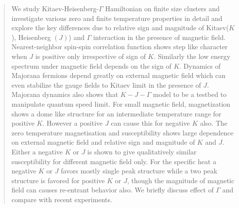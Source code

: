 \documentclass[aps,amsmath,twocolumn,amssymb,floatfix,showpacs,superscriptaddress,nofootinbib,longbibliography]{revtex4-1}
\begin{document}
\begin{abstract}
We study Kitaev-Heisenberg-$\Gamma$ Hamiltonian on finite size clusters and investigate  various zero and finite temperature properties in detail and explore the key differences due to relative sign and magnitude of Kitaev($K$), Heisenberg $(J)$) and $\Gamma$ interaction in the presence of magnetic field. Nearest-neighbor spin-spin correlation function shows step like character when $J$ is positive only irrespective of sign of $K$. Similarly the low energy spectrum under magnetic field depends on the sign of $K$. Dynamics of Majorana fermions depend greatly on external magnetic field which can even stabilize the gauge fields to Kitaev limit in the presence of $J$. Majorana dynamics also shows that $K-J-\Gamma$ model to be a testbed to manipulate quantum speed limit.   For small magnetic field, magnetization shows a dome like structure for an intermediate temperature range for positive $K$. However a positive $J$ can cause this for negative $K$ also. The zero temperature magnetisation and susceptibility shows large dependence on external magnetic field and relative sign and magnitude of $K$ and $J$. Either a negative $K$ or $J$ is shown to give qualitatively similar susceptibility for different magnetic field only.  For the specific heat a negative $K$ or $J$ favors mostly single peak structure while a two peak structure is favored for positive $K$ or $J$, though the magnitude of magnetic field can causes re-entrant behavior also. We briefly discuss effect of $\Gamma$ and compare with recent experiments. 
 
 

\end{abstract}
\end{document}
